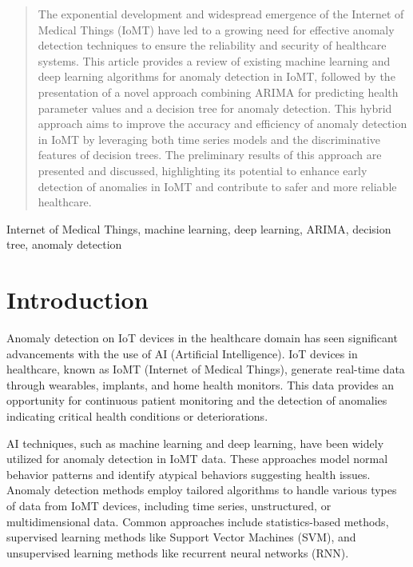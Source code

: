 \documentclass[conference]{IEEEtran}
\begin{document}
\maketitle

\begin{abstract}
The exponential development and widespread emergence of the Internet of Medical Things (IoMT) have led to a growing need for effective anomaly detection techniques to ensure the reliability and security of healthcare systems. This article provides a review of existing machine learning and deep learning algorithms for anomaly detection in IoMT, followed by the presentation of a novel approach combining ARIMA for predicting health parameter values and a decision tree for anomaly detection. This hybrid approach aims to improve the accuracy and efficiency of anomaly detection in IoMT by leveraging both time series models and the discriminative features of decision trees. The preliminary results of this approach are presented and discussed, highlighting its potential to enhance early detection of anomalies in IoMT and contribute to safer and more reliable healthcare.
\end{abstract}

\begin{IEEEkeywords}
Internet of Medical Things, machine learning, deep learning, ARIMA, decision tree, anomaly detection
\end{IEEEkeywords}

\section{Introduction}
Anomaly detection on IoT devices in the healthcare domain has seen significant advancements with the use of AI (Artificial Intelligence). IoT devices in healthcare, known as IoMT (Internet of Medical Things), generate real-time data through wearables, implants, and home health monitors. This data provides an opportunity for continuous patient monitoring and the detection of anomalies indicating critical health conditions or deteriorations.

AI techniques, such as machine learning and deep learning, have been widely utilized for anomaly detection in IoMT data. These approaches model normal behavior patterns and identify atypical behaviors suggesting health issues. Anomaly detection methods employ tailored algorithms to handle various types of data from IoMT devices, including time series, unstructured, or multidimensional data. Common approaches include statistics-based methods, supervised learning methods like Support Vector Machines (SVM), and unsupervised learning methods like recurrent neural networks (RNN).
\end{document}

